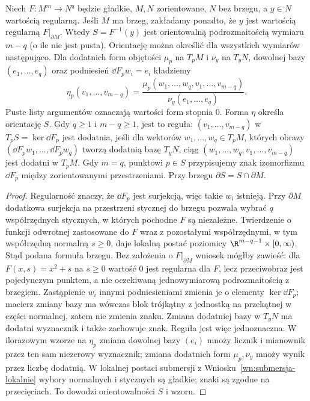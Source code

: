 \begin{twierdzenie}
\label{thm:orientacja-poziomicy}
Niech $F:M^m\to N^q$ będzie gładkie,
$M,N$ zorientowane, $N$ bez brzegu, a $y\in N$ wartością
regularną. Jeśli $M$ ma brzeg, zakładamy ponadto, że $y$
jest wartością regularną $F|_{\partial M}$.
Wtedy $S=F^{-1}(y)$ jest orientowalną podrozmaitością
wymiaru $m-q$ (o ile nie jest pusta). Orientację
można określić dla wszystkich wymiarów następująco.
Dla dodatnich form objętości $\mu_p$ na $T_pM$
i $\nu_y$ na $T_yN$, dowolnej bazy $(e_1,\ldots,e_q)$
oraz podniesień $\dd F_pw_i=e_i$ kładziemy
\[
 \eta_p(v_1,\ldots,v_{m-q})
 =\frac{\mu_p(w_1,\ldots,w_q,v_1,\ldots,v_{m-q})}
        {\nu_y(e_1,\ldots,e_q)}.
\]
Puste listy argumentów oznaczają wartości form stopnia $0$.
Forma $\eta$ określa orientację $S$. Gdy $q\geq1$
i $m-q\geq1$, jest to reguła: $(v_1,\ldots,v_{m-q})$
w $T_pS=\ker\dd F_p$ jest dodatnia, jeśli dla
wektorów $w_1,\ldots,w_q\in T_pM$, których obrazy
$(\dd F_pw_1,\ldots,\dd F_pw_q)$ tworzą dodatnią
bazę $T_yN$, ciąg
$(w_1,\ldots,w_q,v_1,\ldots,v_{m-q})$
jest dodatni w $T_pM$. Gdy $m=q$, punktowi $p\in S$
przypisujemy znak izomorfizmu $\dd F_p$ między
zorientowanymi przestrzeniami. Przy brzegu
$\partial S=S\cap\partial M$.
\end{twierdzenie}
\begin{proof}
Regularność znaczy, że $\dd F_p$ jest surjekcją,
więc takie $w_i$ istnieją. Przy $\partial M$ dodatkowa
surjekcja na przestrzeni stycznej do brzegu pozwala wybrać
$q$ współrzędnych stycznych, w których pochodne $F$ są
niezależne. Twierdzenie o funkcji odwrotnej zastosowane
do $F$ wraz z pozostałymi współrzędnymi, w tym współrzędną
normalną $s\geq0$, daje lokalną postać poziomicy
$\R^{m-q-1}\times[0,\infty)$. Stąd podana formuła brzegu.
Bez założenia o $F|_{\partial M}$ wniosek mógłby zawieść:
dla $F(x,s)=x^2+s$ na $s\geq0$ wartość $0$ jest regularna
dla $F$, lecz przeciwobraz jest pojedynczym punktem,
a nie oczekiwaną jednowymiarową podrozmaitością z brzegiem. Zastąpienie $w_i$
innymi podniesieniami zmienia je o elementy
$\ker\dd F_p$; macierz zmiany bazy ma wówczas
blok trójkątny z jednostką na przekątnej w części
normalnej, zatem nie zmienia znaku. Zmiana
dodatniej bazy w $T_yN$ ma dodatni wyznacznik
i także zachowuje znak. Reguła jest więc
jednoznaczna. W ilorazowym wzorze na $\eta_p$ zmiana
dowolnej bazy $(e_i)$ mnoży licznik i mianownik przez
ten sam niezerowy wyznacznik; zmiana dodatnich form
$\mu_p,\nu_y$ mnoży wynik przez liczbę dodatnią.
W lokalnej postaci submersji z
Wniosku~\ref{wn:submersja-lokalnie} wybory normalnych
i stycznych są gładkie; znaki są zgodne na przecięciach.
To dowodzi orientowalności $S$ i wzoru.
\end{proof}

